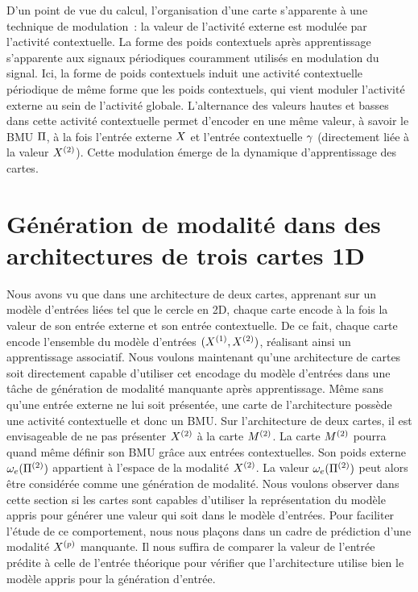 \documentclass[../main]{subfiles}
\begin{document}
D'un point de vue du calcul, l'organisation d'une carte s'apparente à une technique de modulation~: la valeur de l'activité externe est modulée par l'activité contextuelle. 
La forme des poids contextuels après apprentissage s'apparente aux signaux périodiques couramment utilisés en modulation du signal. 
Ici, la forme de poids contextuels induit une activité contextuelle \og périodique \fg{} de même forme que les poids contextuels, qui vient moduler l'activité externe au sein de l'activité globale. 
L'alternance des valeurs hautes et basses dans cette activité contextuelle permet d'encoder en une même valeur, à savoir le BMU $\Pi$, à la fois l'entrée externe $X$ et l'entrée contextuelle $\gamma$ (directement liée à la valeur $X^{({2})}$). 
Cette modulation émerge de la dynamique d'apprentissage des cartes.


\section{Génération de modalité dans des architectures de trois cartes 1D}\label{sec:pred}

Nous avons vu que dans une architecture de deux cartes, apprenant sur un modèle d'entrées liées tel que le cercle en 2D, chaque carte encode à la fois la valeur de son entrée externe et son entrée contextuelle. De ce fait, chaque carte encode l'ensemble du modèle d'entrées $(X^{({1})}, X^{({2})})$, réalisant ainsi un apprentissage associatif. 
Nous voulons maintenant qu'une architecture de cartes soit directement capable d'utiliser cet encodage du modèle d'entrées dans une tâche de génération de modalité manquante après apprentissage.
Même sans qu'une entrée externe ne lui soit présentée, une carte de l'architecture possède une activité contextuelle et donc un BMU. 
Sur l'architecture de deux cartes, il est envisageable de ne pas présenter $X^{({2})}$ à la carte $M^{({2})}$. La carte $M^{({2})}$ pourra quand même définir son BMU grâce aux entrées contextuelles. Son poids externe $\omega_e(\Pi^{({2})})$ appartient à l'espace de la modalité $X^{({2})}$. 
La valeur $\omega_e(\Pi^{({2})})$ peut alors être considérée comme une génération de modalité. 
Nous voulons observer dans cette section si les cartes sont capables d'utiliser la représentation du modèle appris pour générer une valeur qui soit dans le modèle d'entrées.
Pour faciliter l'étude de ce comportement, nous nous plaçons dans un cadre de prédiction d'une modalité $X^{({p})}$ manquante. 
Il nous suffira de comparer la valeur de l'entrée prédite à celle de l'entrée théorique pour vérifier que l'architecture utilise bien le modèle appris pour la génération d'entrée.
\end{document}

